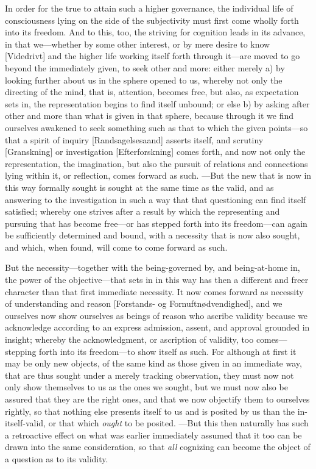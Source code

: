 \documentclass[12pt,a4paper]{book}
\begin{document}
In order for the true to attain such a higher governance, the individual life of
consciousness lying on the side of the subjectivity must first come wholly forth
into its freedom. And to this, too, the striving for cognition leads in its
advance, in that we---whether by some other interest, or by mere desire to know
[Videdrivt] and the higher life working itself forth through it---are moved to go
beyond the immediately given, to seek other and more: either merely a) by looking
further about us in the sphere opened to us, whereby not only the directing of the
mind, that is, attention, becomes free, but also, as expectation sets in, the
representation begins to find itself unbound; or else b) by asking after other and
more than what is given in that sphere, because through it we find ourselves
awakened to seek something such as that to which the given points---so that a
spirit of inquiry [Randsagelsesaand] asserts itself, and scrutiny [Granskning] or
investigation [Efterforskning] comes forth, and now not only the representation,
the imagination, but also the pursuit of relations and connections lying within
it, or reflection, comes forward as such. ---But the new that is now in this way
formally sought is sought at the same time as the valid, and as answering to the
investigation in such a way that that questioning can find itself satisfied;
whereby one strives after a result by which the representing and pursuing that has
become free---or has stepped forth into its freedom---can again be sufficiently
determined and bound, with a necessity that is now also sought, and which, when
found, will come to come forward as such.

But the necessity---together with the being-governed by, and being-at-home in, the
power of the objective---that sets in in this way has then a different and freer
character than that first immediate necessity. It now comes forward as necessity
of understanding and reason [Forstands- og Fornuftnødvendighed], and we ourselves
now show ourselves as beings of reason who ascribe validity because we acknowledge
according to an express admission, assent, and approval grounded in insight;
whereby the acknowledgment, or ascription of validity, too comes---stepping forth
into its freedom---to show itself as such. For although at first it may be only new
objects, of the same kind as those given in an immediate way, that are thus sought
under a merely tracking observation, they must now not only show themselves to us
as the ones we sought, but we must now also be assured that they are the right
ones, and that we now objectify them to ourselves rightly, so that nothing else
presents itself to us and is posited by us than the in-itself-valid, or that which
\emph{ought} to be posited. ---But this then naturally has such a retroactive
effect on what was earlier immediately assumed that it too can be drawn into the
same consideration, so that \emph{all} cognizing can become the object of a
question as to its validity.
\end{document}
